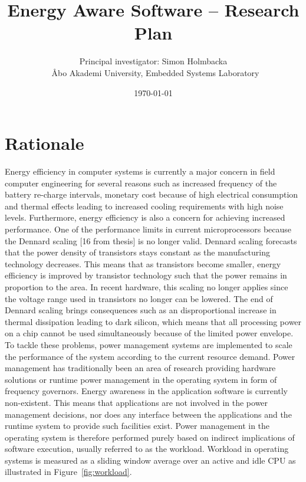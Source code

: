 \documentclass{article}
\title{Energy Aware Software -- Research Plan} %
\author{Principal investigator: Simon Holmbacka\\ \AA{}bo Akademi University, Embedded Systems Laboratory} %
\date{\today} %
\begin{document}
\maketitle %

\section{Rationale}
Energy efficiency in computer systems is currently a major concern in field computer engineering for several reasons such as increased frequency of the battery re-charge intervals, 
monetary cost because of high electrical consumption and thermal effects leading to increased cooling requirements with high noise levels. 
Furthermore, energy efficiency is also a concern for achieving increased performance. 
One of the performance limits in current microprocessors because the Dennard scaling [16 from thesis] is no longer valid. 
Dennard scaling forecasts that the power density of transistors stays constant as the manufacturing technology decreases. 
This means that as transistors become smaller, energy efficiency is improved by transistor technology such that the power remains in proportion to the area. 
In recent hardware, this scaling no longer applies since the voltage range used in transistors no longer can be lowered. 
The end of Dennard scaling brings consequences such as an disproportional increase in thermal dissipation leading to dark silicon, 
which means that all processing power on a chip cannot be used simultaneously because of the limited power envelope.
To tackle these problems, power management systems are implemented to scale the performance of the system according to the current resource demand. 
Power management has traditionally been an area of research providing hardware solutions or runtime power management in the operating system in form of frequency governors. 
Energy awareness in the application software is currently non-existent. This means that applications are not involved in the power management decisions, 
nor does any interface between the applications and the runtime system to provide such facilities exist. 
Power management in the operating system is therefore performed purely based on indirect implications of software execution, usually referred to as the workload. 
Workload in operating systems is measured as a sliding window average over an active and idle CPU as illustrated in Figure~\ref{fig:workload}. 
\end{document}
